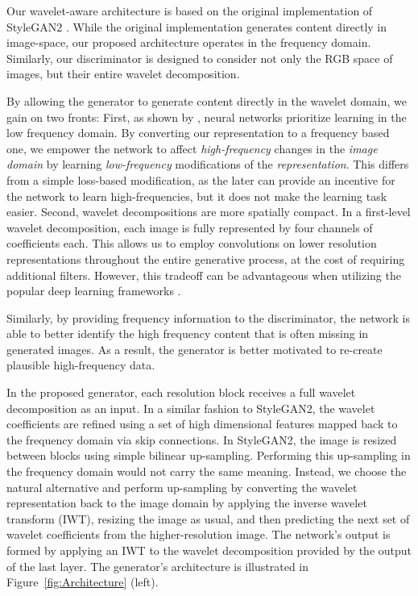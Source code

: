 \documentclass[final]{CVPR2021/cvpr}
\begin{document}
Our wavelet-aware architecture is based on the \mbox{original} implementation of StyleGAN2 \citep{karras2020analyzing}. While the original implementation generates content directly in image-space, our proposed architecture operates in the frequency domain. Similarly, our discriminator is designed to consider not only the RGB space of images, but their entire wavelet \mbox{decomposition}. 

By allowing the generator to generate content directly in the wavelet domain, we gain on two fronts: First, as shown by \citep{rahaman2019spectral}, neural networks prioritize learning in the low frequency domain. By converting our representation to a frequency based one, we empower the network to affect \textit{high-frequency} changes in the \textit{image domain} by learning \textit{low-frequency} modifications of the \textit{representation}. This differs from a simple loss-based modification, as the later can provide an incentive for the network to learn high-frequencies, but it does not make the learning task easier. 
Second, wavelet decompositions are more spatially compact. In a first-level wavelet decomposition, each  image is fully represented by four channels of  coefficients each. This allows us to employ convolutions on lower resolution representations throughout the entire generative process, at the cost of requiring additional filters. However, this tradeoff can be advantageous when utilizing the popular deep learning frameworks \citep{jorda2019performance}.

Similarly, by providing frequency information to the discriminator, the network is able to better identify the high frequency content that is often missing in generated images. As a result, the generator is better motivated to re-create plausible high-frequency data. 

In the proposed generator, each resolution block receives a full wavelet decomposition as an input. In a similar fashion to StyleGAN2, the wavelet coefficients are refined using a set of high dimensional features mapped back to the frequency domain via skip connections. In StyleGAN2, the image is resized between blocks using simple \mbox{bilinear} \mbox{up-sampling}. Performing this up-sampling in the \mbox{frequency} domain would not carry the same meaning. Instead, we choose the natural alternative and perform up-sampling by converting the wavelet representation back to the image domain by applying the inverse wavelet transform (IWT), \mbox{resizing} the image as usual, and then predicting the next set of wavelet coefficients from the higher-resolution \mbox{image}. The network's output is formed by applying an IWT to the wavelet decomposition provided by the output of the last layer. The generator's architecture is illustrated in Figure~\ref{fig:Architecture} (left).
\end{document}
